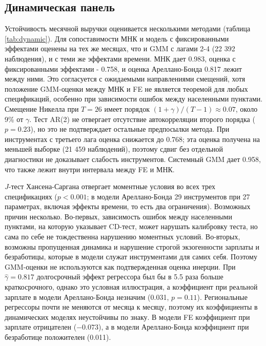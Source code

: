 \documentclass[12pt, a4paper]{article}
\begin{document}
\subsection*{Динамическая панель}

Устойчивость месячной выручки оценивается несколькими методами (таблица \ref{tab:dynamic}). Для
сопоставимости МНК и модель с фиксированными эффектами оценены на тех же месяцах, что и GMM с
лагами 2-4 (22 392 наблюдения), и с теми же эффектами времени. МНК дает 0.983, оценка с
фиксированными эффектами - 0.758, и оценка Ареллано-Бонда 0.817 лежит между ними. Это
согласуется с ожидаемыми направлениями смещений, хотя положение GMM-оценки между МНК и FE не
является теоремой для любых спецификаций, особенно при зависимости ошибок между населенными пунктами.
Смещение Никелла при $T = 26$ имеет порядок $(1 + \gamma) / (T - 1) \approx 0.07$, около 9\% от
$\gamma$. Тест AR(2) не отвергает отсутствие автокорреляции второго порядка ($p = 0.23$), но это не
подтверждает остальные предпосылки метода. При инструментах с третьего лага оценка снижается до
0.768; эта оценка получена на меньшей выборке (21 459 наблюдений), поэтому сдвиг без отдельной
диагностики не доказывает слабость инструментов. Системный GMM дает 0.958, что также лежит внутри
интервала между FE и МНК.

$J$-тест Хансена-Саргана отвергает моментные условия во всех трех спецификациях ($p < 0.001$; в
модели Ареллано-Бонда 29 инструментов при 27 параметрах, включая эффекты времени, то есть два
ограничения). Возможных причин несколько. Во-первых, зависимость ошибок между населенными пунктами, на которую
указывает CD-тест, может нарушать калибровку теста, но сама по себе не тождественна нарушению
моментных условий. Во-вторых, возможны пропущенная динамика и нарушение строгой экзогенности зарплаты и
безработицы, которые в модели служат инструментами для самих себя. Поэтому GMM-оценки не
используются как подтвержденная оценка инерции. При $\hat{\gamma} = 0.817$ долгосрочный эффект
регрессора был бы в 5.5 раза больше краткосрочного, однако это условная иллюстрация, а
коэффициент при реальной зарплате в модели Ареллано-Бонда незначим (0.031, $p = 0.11$).
Региональные регрессоры почти не меняются от месяца к месяцу, поэтому их коэффициенты в
динамических моделях неустойчивы по знаку. В модели FE коэффициент при зарплате отрицателен
($-0.073$), а в модели Ареллано-Бонда коэффициент при безработице положителен (0.011).
\end{document}
